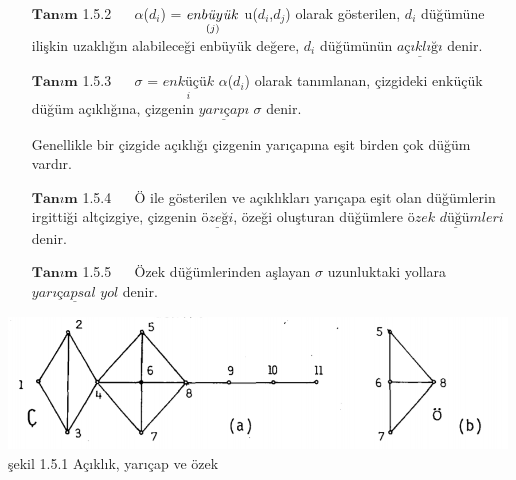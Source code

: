 \documentclass[11pt]{amsbook}
\begin{document}

\begin{itemize}
\item[$\mathbf{Tanım}$ 1.5.2  $\quad$]  $\alpha$($d_i$) = $\underset{(j)}{enb\textrm{\textit{\"{u}}}y\textrm{\textit{\"{u}}}k}$ u($d_i$,$d_j$) olarak gösterilen, $d_i$ düğümüne ilişkin uzaklığın alabileceği enbüyük değere, $d_i$ düğümünün $\mathit{\underline{\textit{açıklığı}}}$ denir. \par
\end{itemize}

\begin{itemize}
\item[$\mathbf{Tanım}$ 1.5.3  $\quad$]  $\sigma$ = $\underset{i}{\textit{enküçük}}$ {$\alpha$($d_i$)} olarak tanımlanan, çizgideki enküçük düğüm açıklığına, çizgenin $\mathit{\underline{\textit{yarıçapı}}}$ $\sigma$ denir.\par

\item[Genellikle] bir çizgide açıklığı çizgenin yarıçapına eşit birden çok düğüm vardır.\par

\end{itemize}



\begin{itemize}
\item[$\mathbf{Tanım}$ 1.5.4  $\quad$]  Ö ile gösterilen ve açıklıkları yarıçapa eşit olan düğümlerin irgittiği altçizgiye, çizgenin $\mathit{\underline{\textit{özeği}}}$, özeği oluşturan düğümlere $\mathit{\underline{\textit{özek düğümleri}}}$ denir.\par
\end{itemize}

\begin{itemize}
\item[$\mathbf{Tanım}$ 1.5.5  $\quad$] Özek düğümlerinden aşlayan $\sigma$ uzunluktaki yollara $\mathit{\underline{\textit{yarıçapsal yol}}}$ denir.\par
\end{itemize}

\includegraphics[width=500px]{images/sekil}
şekil 1.5.1 Açıklık, yarıçap ve özek
\end{document}

